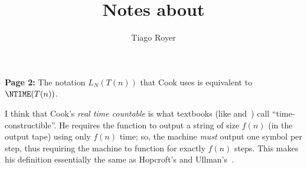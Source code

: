 \documentclass{article}
\begin{document}
\title{Notes about \cite{Cook1973}}
\author{Tiago Royer}
\maketitle

\textbf{Page 2:} The notation $L_N(T(n))$ that Cook uses
is equivalent to $\NTIME(T(n))$.

I think that Cook's \emph{real time countable}
is what textbooks (like \cite{HopcroftUllman1979} and~\cite{AroraBarak2009})
call ``time-constructible''.
He requires the function to output a string of size $f(n)$
(in the output tape)
using only $f(n)$ time;
so, the machine \emph{must} output one symbol per step,
thus requiring the machine to function for exactly $f(n)$ steps.
This makes his definition essentially the same as
Hopcroft's and Ullman's~\cite[p.~299]{HopcroftUllman1979}.



\end{document}
